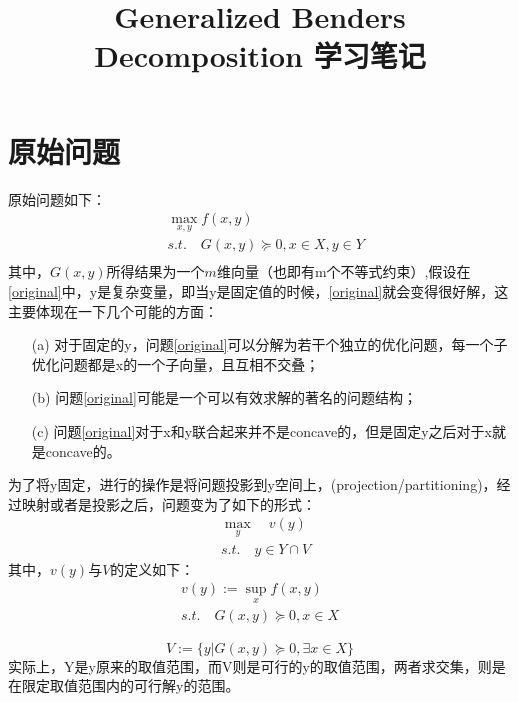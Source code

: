 \documentclass[UTF8,a4]{article}
\begin{document}
\title{Generalized Benders Decomposition 学习笔记}
\maketitle
\section{原始问题}
原始问题如下：
\begin{equation}
\label{original}
\begin{split}
&\max_{x,y}f(x,y)\\
&s.t.\quad G(x,y)\succeq 0,x\in X,y\in Y\\
\end{split}
\end{equation}
其中，$G(x,y)$所得结果为一个$m$维向量（也即有m个不等式约束）,假设在\eqref{original}中，y是复杂变量，即当y是固定值的时候，\eqref{original}就会变得很好解，这主要体现在一下几个可能的方面：
\begin{itemize}
\item[(a)]对于固定的y，问题\eqref{original}可以分解为若干个独立的优化问题，每一个子优化问题都是x的一个子向量，且互相不交叠；
\item[(b)]问题\eqref{original}可能是一个可以有效求解的著名的问题结构；
\item[(c)]问题\eqref{original}对于x和y联合起来并不是concave的，但是固定y之后对于x就是concave的。
\end{itemize}

为了将y固定，进行的操作是将问题投影到y空间上，(projection/partitioning)，经过映射或者是投影之后，问题变为了如下的形式：
\begin{equation}
\label{2}
\begin{split}
&\max_y \quad v(y)\\
&s.t.\quad y\in Y\cap V
\end{split}
\end{equation}
其中，$v(y)$与$V$的定义如下：
\begin{equation}
\label{3}
\begin{split}
v(y):=\sup_x f(x,y)\\
s.t. \quad G(x,y)\succeq 0,x\in X
\end{split}
\end{equation}

\begin{equation}
\label{4}
V:=\{y|G(x,y)\succeq 0,\exists x\in X\}
\end{equation}
实际上，Y是y原来的取值范围，而V则是可行的y的取值范围，两者求交集，则是在限定取值范围内的可行解y的范围。
\end{document}
